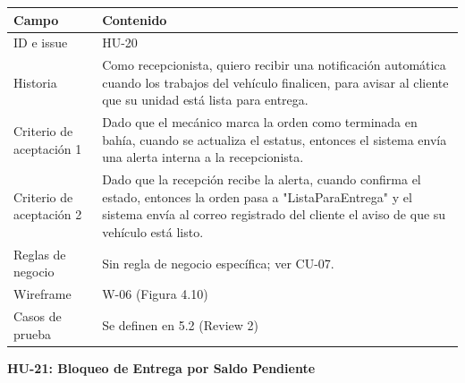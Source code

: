 {\def\LTcaptype{none} %
\begin{longtable}[]{@{}
  >{\raggedright\arraybackslash}p{}
  >{\raggedright\arraybackslash}p{}@{}}
\toprule\noalign{}
\begin{minipage}[b]{\linewidth}\raggedright
\textbf{Campo}
\end{minipage} & \begin{minipage}[b]{\linewidth}\raggedright
\textbf{Contenido}
\end{minipage} \\
\midrule\noalign{}
\endhead
\bottomrule\noalign{}
\endlastfoot
ID e issue & HU-20 \\
Historia & Como recepcionista, quiero recibir una notificación
automática cuando los trabajos del vehículo finalicen, para avisar al
cliente que su unidad está lista para entrega. \\
Criterio de aceptación 1 & Dado que el mecánico marca la orden como
terminada en bahía, cuando se actualiza el estatus, entonces el sistema
envía una alerta interna a la recepcionista. \\
Criterio de aceptación 2 & Dado que la recepción recibe la alerta,
cuando confirma el estado, entonces la orden pasa a
"ListaParaEntrega" y el sistema envía al correo registrado del cliente
el aviso de que su vehículo está listo. \\
Reglas de negocio & Sin regla de negocio específica; ver CU-07. \\
Wireframe & W-06 (Figura 4.10) \\
Casos de prueba & Se definen en 5.2 (Review 2) \\
\end{longtable}
}

\textbf{HU-21: Bloqueo de Entrega por Saldo Pendiente}


